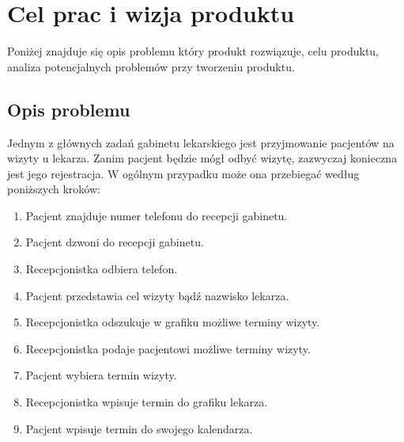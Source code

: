 \documentclass[polish,12pt]{aghthesis}
\author{Wojciech Karpiel\\ Michał Hamuda\\ Filip Galas}
\date{2017}
\begin{document}
\maketitle

\tableofcontents

\newpage

\section{Cel prac i wizja produktu}
\label{sec:cel-wizja}

Poniżej znajduje się opis problemu który produkt rozwiązuje, celu produktu, analiza potencjalnych problemów przy tworzeniu produktu.
  
\subsection{Opis problemu}
Jednym z głównych zadań gabinetu lekarskiego jest przyjmowanie pacjentów na wizyty u lekarza. Zanim pacjent będzie mógł odbyć wizytę, zazwyczaj konieczna jest jego rejestracja. W ogólnym przypadku może ona przebiegać według poniższych kroków:

\begin{enumerate}
  \item Pacjent znajduje numer telefonu do recepcji gabinetu.
  \item Pacjent dzwoni do recepcji gabinetu.
  \item Recepcjonistka odbiera telefon.
  \item Pacjent przedstawia cel wizyty bądź nazwisko lekarza.
  \item Recepcjonistka odszukuje w grafiku możliwe terminy wizyty.
  \item Recepcjonistka podaje pacjentowi możliwe terminy wizyty.
  \item Pacjent wybiera termin wizyty.
  \item Recepcjonistka wpisuje termin do grafiku lekarza.
  \item Pacjent wpisuje termin do swojego kalendarza.
\end{enumerate}
\end{document}
